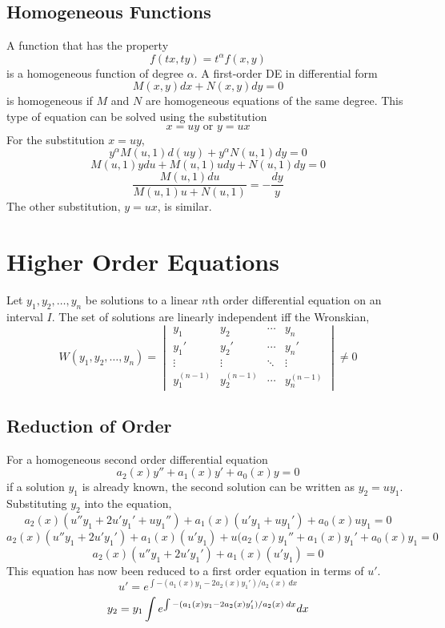 \documentclass{article}
\begin{document}
\subsection{Homogeneous Functions}
A function that has the property
$$f(tx,ty) = t^\alpha f(x,y)$$
is a homogeneous function of degree $\alpha$. A first-order DE in differential form
$$M(x,y) dx + N(x,y) dy = 0$$
is homogeneous if $M$ and $N$ are homogeneous equations of the same degree. This type of equation can be solved using the substitution
$$x = uy \textrm{ or } y = ux$$
For the substitution $x=uy$,
$$y^\alpha M(u,1) d(uy) +y^\alpha N(u,1) dy = 0$$
$$M(u,1)ydu + M(u,1) udy + N(u,1) dy = 0$$
$$\frac{M(u,1) du}{M(u,1)u + N(u,1)} = -\frac{dy}{y}$$
The other substitution, $y=ux$, is similar. 

\section{Higher Order Equations}
Let $y_1 , y_2 , \dots , y_n$ be solutions to a linear $n$th order differential equation on an interval $I$. The set of solutions are linearly independent iff the Wronskian, 
$$W(y_1 , y_2 , \dots , y_n) = \begin{vmatrix}
    y_1 & y_2 & \cdots & y_n \\
    y_1 ' & y_2 ' & \cdots & y_n '\\
    \vdots & \vdots & \ddots & \vdots \\
    y_1 ^{(n-1)} & y_2 ^{(n-1)} & \cdots & y_n ^{(n-1)}
\end{vmatrix} \neq 0$$
\subsection{Reduction of Order}
For a homogeneous second order differential equation
$$a_2 (x) y '' + a_1 (x) y' + a_0 (x) y = 0$$
if a solution $y_1$ is already known, the second solution can be written as $ y_2 = u y_1$. Substituting $y_2$ into the equation, 
$$a_2 (x) (u'' y_1 + 2u'y_1' + u y_1 '') + a_1 (x) (u' y_1 + u y_1 ') + a_0 (x) u y_1 = 0$$
$$a_2 (x) (u'' y_1 + 2u' y_1 ') + a_1 (x) (u' y_1 ) + u(a_2 (x) y_1 '' + a_1 (x) y_1 ' + a_0 (x) y_1 = 0$$
$$a_2 (x) (u'' y_1 + 2u' y_1 ') + a_1 (x) (u' y_1 ) = 0$$
This equation has now been reduced to a first order equation in terms of $u'$.
$$u' = e^{\int -(a_1(x) y_1 - 2a_2 (x) y_1 ')/a_2(x) \hspace{2pt}dx}$$
$$y_2 = y_1 \int e^{\int -(a_1(x) y_1 - 2a_2 (x) y_1 ')/a_2(x) \hspace{2 pt} dx} dx$$
\end{document}
